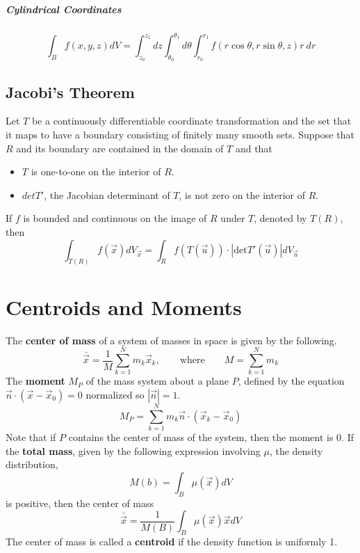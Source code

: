 \documentclass[11pt]{article}
\begin{document}
	\subparagraph{Cylindrical Coordinates}
		\begin{equation}
			\int_B f(x, y, z)dV = \int_{z_0}^{z_1} dz \int_{\theta_0}^{\theta_1} d\theta \int_{r_0}^{r_1} f(r\cos \theta, r\sin \theta, z)r\ dr
		\end{equation}
		
		\subsection{Jacobi's Theorem}
			Let $T$ be a continuously differentiable coordinate transformation and the set that it maps to have a boundary consisting of finitely many smooth sets. Suppose that $R$ and its boundary are contained in the domain of $T$ and that
			\begin{itemize}
				\item $T$ is one-to-one on the interior of $R$.
				\item $det T'$, the Jacobian determinant of $T$, is not zero on the interior of $R$.
			\end{itemize}
			If $f$ is bounded and continuous on the image of $R$ under $T$, denoted by $T(R)$, then
			\begin{equation}
				\int_{T(R)} f(\vec{x})dV_{\vec{x}} = \int_R f(T(\vec{u}))\cdot|\text{det}T'(\vec{u})|dV_{\vec{u}}
			\end{equation}
			
\section{Centroids and Moments}
	The \textbf{center of mass} of a system of masses in space is given by the following.
	\begin{equation}
		\bar{\vec{x}} = \frac{1}{M}\sum_{k=1}^N m_k\vec{x}_k, \qquad \text{where} \qquad M=\sum_{k=1}^N m_k
	\end{equation}
	The \textbf{moment} $M_P$ of the mass system about a plane $P$, defined by the equation $\vec{n} \cdot (\vec{x} - \vec{x}_0) = 0$ normalized so $|\vec{n}| = 1$.
	\begin{equation}
		M_P = \sum_{k=1}^N m_k\vec{n} \cdot (\vec{x}_k - \vec{x}_0)
	\end{equation}
	Note that if $P$ contains the center of mass of the system, then the moment is 0. If the \textbf{total mass}, given by the following expression involving $\mu$, the density distribution,
	\begin{equation}
		M(b) = \int_B \mu(\vec{x})dV
	\end{equation}
	is positive, then the center of mass
	\begin{equation}
		\bar{\vec{x}} = \frac{1}{M(B)} \int_B \mu(\vec{x})\vec{x}dV
	\end{equation}
	The center of mass is called a  \textbf{centroid} if the density function is uniformly 1. 
	
\end{document}
